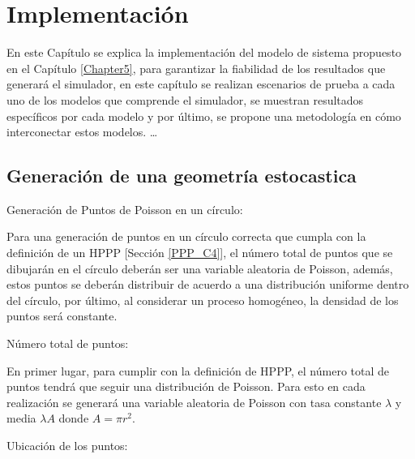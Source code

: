 
\chapter{Implementación} %

\label{Chapter6} %

En este Capítulo se explica la implementación del modelo de sistema propuesto en el Capítulo \ref{Chapter5}, para garantizar la fiabilidad de los resultados que generará el simulador, en este capítulo se realizan escenarios de prueba a cada uno de los modelos que comprende el simulador, se muestran resultados específicos por cada modelo y por último, se propone una metodología en cómo interconectar estos modelos. \ldots


\section{Generación de una geometría estocastica}

Generación de Puntos de Poisson en un círculo: \newline

Para una generación de puntos en un círculo correcta que cumpla con la definición de un HPPP [Sección \ref{PPP_C4}], el número total de puntos que se dibujarán en el círculo deberán ser una variable aleatoria de Poisson, además, estos puntos se deberán distribuir de acuerdo a una distribución uniforme dentro del círculo, por último, al considerar un proceso homogéneo, la densidad de los puntos será constante.\newline

Número total de puntos:\newline

En primer lugar, para cumplir con la definición de HPPP, el número total de puntos tendrá que seguir una distribución de Poisson. Para esto en cada realización se generará una variable aleatoria de Poisson con tasa constante $\lambda$ y media $\lambda A$ donde $A=\pi r^{2}$. \newline

Ubicación de los puntos:\newline

